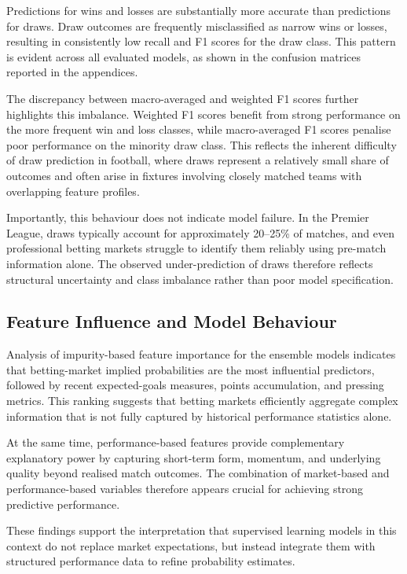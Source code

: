 \documentclass[11pt,a4paper]{article}
\begin{document}
Predictions for wins and losses are substantially more accurate than predictions for draws. Draw outcomes are frequently misclassified as narrow wins or losses, resulting in consistently low recall and F1 scores for the draw class. This pattern is evident across all evaluated models, as shown in the confusion matrices reported in the appendices.

The discrepancy between macro-averaged and weighted F1 scores further highlights this imbalance. Weighted F1 scores benefit from strong performance on the more frequent win and loss classes, while macro-averaged F1 scores penalise poor performance on the minority draw class. This reflects the inherent difficulty of draw prediction in football, where draws represent a relatively small share of outcomes and often arise in fixtures involving closely matched teams with overlapping feature profiles.

Importantly, this behaviour does not indicate model failure. In the Premier League, draws typically account for approximately 20--25\% of matches, and even professional betting markets struggle to identify them reliably using pre-match information alone. The observed under-prediction of draws therefore reflects structural uncertainty and class imbalance rather than poor model specification.

\subsection{Feature Influence and Model Behaviour}

Analysis of impurity-based feature importance for the ensemble models indicates that betting-market implied probabilities are the most influential predictors, followed by recent expected-goals measures, points accumulation, and pressing metrics. This ranking suggests that betting markets efficiently aggregate complex information that is not fully captured by historical performance statistics alone.

At the same time, performance-based features provide complementary explanatory power by capturing short-term form, momentum, and underlying quality beyond realised match outcomes. The combination of market-based and performance-based variables therefore appears crucial for achieving strong predictive performance.

These findings support the interpretation that supervised learning models in this context do not replace market expectations, but instead integrate them with structured performance data to refine probability estimates.
\end{document}
